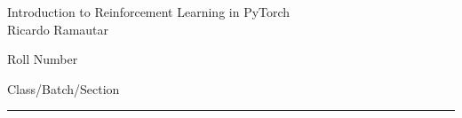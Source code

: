 \documentclass[12pt,letterpaper, onecolumn]{exam}
\begin{document}
\begingroup  
    \centering
    \large Introduction to Reinforcement Learning in PyTorch \cite{medium}\\
    \large Ricardo Ramautar\par
    \large Roll Number\par
    \large Class/Batch/Section\par
\endgroup
\rule{\textwidth}{0.4pt}
\pointsdroppedatright   %
\printanswers
\renewcommand{\solutiontitle}{\noindent\textbf{Ans:}\enspace}   %


    
    
    

    
    
    

\printbibliography[title={References}]
\end{document}
